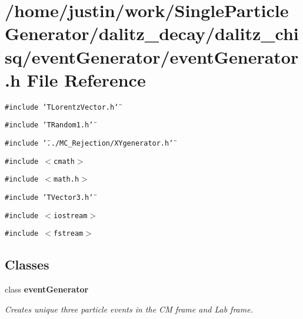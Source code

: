 \section{/home/justin/work/Single\-Particle\-Generator/dalitz\_\-decay/dalitz\_\-chisq/event\-Generator/event\-Generator.h File Reference}
\label{eventGenerator_8h}
{\tt \#include \char`\"{}TLorentz\-Vector.h\char`\"{}}\par
{\tt \#include \char`\"{}TRandom1.h\char`\"{}}\par
{\tt \#include \char`\"{}../MC\_\-Rejection/XYgenerator.h\char`\"{}}\par
{\tt \#include $<$cmath$>$}\par
{\tt \#include $<$math.h$>$}\par
{\tt \#include \char`\"{}TVector3.h\char`\"{}}\par
{\tt \#include $<$iostream$>$}\par
{\tt \#include $<$fstream$>$}\par
\subsection*{Classes}
\begin{CompactItemize}
\item 
class \bf{event\-Generator}
\begin{CompactList}\small\item\em Creates unique three particle events in the CM frame and Lab frame. \item\end{CompactList}\end{CompactItemize}
